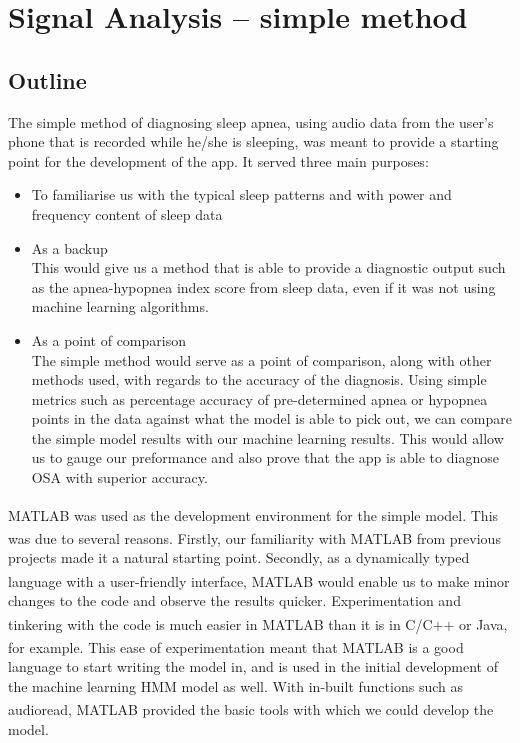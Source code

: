 \section{Signal Analysis -- simple method}

\subsection{Outline}

The simple method of diagnosing sleep apnea, using audio data from the user's phone that is recorded while he/she is sleeping, was meant to provide a starting point for the development of the app. It served three main purposes:

\begin{itemize}
\item To familiarise us with the typical sleep patterns and with power and frequency content of sleep data
\item As a backup\\
This would give us a method that is able to provide a diagnostic output such as the apnea-hypopnea index score from sleep data, even if it was not using machine learning algorithms. 
\item As a point of comparison\\
The simple method would serve as a point of comparison, along with other methods used, with regards to the accuracy of the diagnosis. Using simple metrics such as percentage accuracy of pre-determined apnea or hypopnea points in the data against what the model is able to pick out, we can compare the simple model results with our machine learning results. This would allow us to gauge our preformance and also prove that the app is able to diagnose OSA with superior accuracy.
\end{itemize}

MATLAB\textsuperscript{\textregistered{}} was used as the development environment for the simple model. This was due to several reasons. Firstly, our familiarity with MATLAB\textsuperscript{\textregistered{}} from previous projects made it a natural starting point. Secondly, as a dynamically typed language with a user-friendly interface, MATLAB\textsuperscript{\textregistered{}} would enable us to make minor changes to the code and observe the results quicker. Experimentation and tinkering with the code is much easier in MATLAB\textsuperscript{\textregistered{}}  than it is in C/C++ or Java, for example. This ease of experimentation meant that MATLAB\textsuperscript{\textregistered{}} is a good language to start writing the model in, and is used in the initial development of the machine learning HMM model as well. With in-built functions such as audioread, MATLAB\textsuperscript{\textregistered{}}  provided the basic tools with which we could develop the model.


